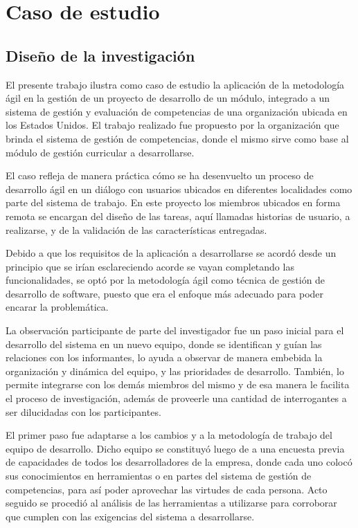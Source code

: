 \section{Caso de estudio}
\subsection{Diseño de la investigación}
El presente trabajo ilustra como caso de estudio la aplicación de la metodología ágil en la gestión de un proyecto de desarrollo de un módulo, integrado a un sistema de gestión y evaluación de competencias de una organización ubicada en los Estados Unidos. El trabajo realizado fue propuesto por la organización que brinda el sistema de gestión de competencias, donde el mismo sirve como base al módulo de gestión curricular a desarrollarse.

El caso refleja de manera práctica cómo se ha desenvuelto un proceso de desarrollo ágil en un diálogo con usuarios ubicados en diferentes localidades como parte del sistema de trabajo. En este proyecto los miembros ubicados en forma remota se encargan del diseño de las tareas, aquí llamadas historias de usuario, a realizarse, y de la validación de las características entregadas.

Debido a que los requisitos de la aplicación a desarrollarse se acordó desde un principio que se irían esclareciendo acorde se vayan completando las funcionalidades, se optó por la metodología ágil como técnica de gestión de desarrollo de software, puesto que era el enfoque más adecuado para poder encarar la problemática.

La observación participante de parte del investigador fue un paso inicial para el desarrollo del sistema en un nuevo equipo, donde se identifican y guían las relaciones con los informantes, lo ayuda a observar de manera embebida la organización y dinámica del equipo, y las prioridades de desarrollo. También, lo permite integrarse con los demás miembros del mismo y de esa manera le facilita el proceso de investigación, además de proveerle una cantidad de interrogantes a ser dilucidadas con los participantes\citep{erlandson_doing_1993}.

El primer paso fue adaptarse a los cambios y a la metodología de trabajo del equipo de desarrollo. Dicho equipo se constituyó luego de a una encuesta previa de capacidades de todos los desarrolladores de la empresa, donde cada uno colocó sus conocimientos en herramientas o en partes del sistema de gestión de competencias, para así poder aprovechar las virtudes de cada persona. Acto seguido se procedió al análisis de las herramientas a utilizarse para corroborar que cumplen con las exigencias del sistema a desarrollarse.

